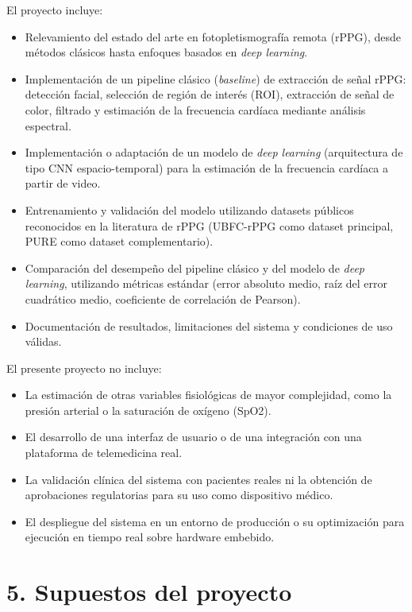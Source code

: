 \documentclass[
11pt, %
]{charter}
\begin{document}
	El proyecto incluye:
	\begin{itemize}
		\item Relevamiento del estado del arte en fotopletismografía remota (rPPG), desde métodos clásicos hasta enfoques basados en \textit{deep learning}.
		\item Implementación de un pipeline clásico (\textit{baseline}) de extracción de señal rPPG: detección facial, selección de región de interés (ROI), extracción de señal de color, filtrado y estimación de la frecuencia cardíaca mediante análisis espectral.
		\item Implementación o adaptación de un modelo de \textit{deep learning} (arquitectura de tipo CNN espacio-temporal) para la estimación de la frecuencia cardíaca a partir de video.
		\item Entrenamiento y validación del modelo utilizando datasets públicos reconocidos en la literatura de rPPG (UBFC-rPPG como dataset principal, PURE como dataset complementario).
		\item Comparación del desempeño del pipeline clásico y del modelo de \textit{deep learning}, utilizando métricas estándar (error absoluto medio, raíz del error cuadrático medio, coeficiente de correlación de Pearson).
		\item Documentación de resultados, limitaciones del sistema y condiciones de uso válidas.
	\end{itemize}
	
	El presente proyecto no incluye:
	\begin{itemize}
		\item La estimación de otras variables fisiológicas de mayor complejidad, como la presión arterial o la saturación de oxígeno (SpO2).
		\item El desarrollo de una interfaz de usuario o de una integración con una plataforma de telemedicina real.
		\item La validación clínica del sistema con pacientes reales ni la obtención de aprobaciones regulatorias para su uso como dispositivo médico.
		\item El despliegue del sistema en un entorno de producción o su optimización para ejecución en tiempo real sobre hardware embebido.
	\end{itemize}
	
	\section{5. Supuestos del proyecto}
	\label{sec:supuestos}
	
\end{document}
